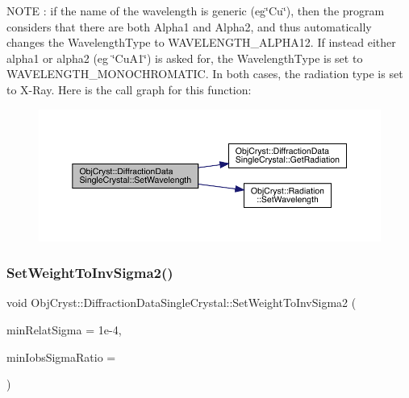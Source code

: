 N\+O\+TE \+: if the name of the wavelength is generic (eg\char`\"{}\+Cu\char`\"{}), then the program considers that there are both Alpha1 and Alpha2, and thus automatically changes the Wavelength\+Type to W\+A\+V\+E\+L\+E\+N\+G\+T\+H\+\_\+\+A\+L\+P\+H\+A12. If instead either alpha1 or alpha2 (eg \char`\"{}\+Cu\+A1\char`\"{}) is asked for, the Wavelength\+Type is set to W\+A\+V\+E\+L\+E\+N\+G\+T\+H\+\_\+\+M\+O\+N\+O\+C\+H\+R\+O\+M\+A\+T\+IC. In both cases, the radiation type is set to X-\/\+Ray. Here is the call graph for this function\+:
\nopagebreak
\begin{figure}[H]
\begin{center}
\leavevmode
\includegraphics[width=350pt]{class_obj_cryst_1_1_diffraction_data_single_crystal_a231437207dca7389aa593b1fd4fd9f1b_cgraph}
\end{center}
\end{figure}
\mbox{\label{class_obj_cryst_1_1_diffraction_data_single_crystal_a76f0f6b9eab4f00b7fa9afc17e951235}} 
\subsubsection{\texorpdfstring{SetWeightToInvSigma2()}{SetWeightToInvSigma2()}}
{\footnotesize\ttfamily void Obj\+Cryst\+::\+Diffraction\+Data\+Single\+Crystal\+::\+Set\+Weight\+To\+Inv\+Sigma2 (\begin{DoxyParamCaption}\item[{const R\+E\+AL}]{min\+Relat\+Sigma = {\ttfamily 1e-\/4},  }\item[{const R\+E\+AL}]{min\+Iobs\+Sigma\+Ratio = {} }\end{DoxyParamCaption})\hspace{0.3cm}{\ttfamily [virtual]}}



